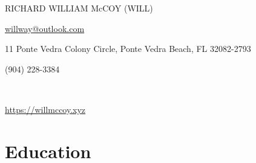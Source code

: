 \documentclass{article}
\newcommand\midtextbox[1]{%
  \parbox{.6\textwidth}{#1}%
}
\newcommand\outtextbox[1]{%
  \parbox{.2\textwidth}{#1}%
}
\newenvironment{TitleCenter}[1][\topsep]
  {\setlength{\topsep}{#1}\par\kern\topsep\centering}%
  {\par\kern\topsep}%
\begin{document}
\thispagestyle{empty}

\begin{TitleCenter}[0em]
\bfseries\huge

RICHARD WILLIAM McCOY (WILL)
\end{TitleCenter}
\noindent\outtextbox{\href{willway@outlook.com}{willway@outlook.com}\hfill}\midtextbox{\hfil11 Ponte Vedra Colony Circle, Ponte Vedra Beach, FL 32082-2793\hfil}\outtextbox{\hfill (904) 228-3384} \\
\noindent\outtextbox{\href{https://willmccoy.xyz}{https://willmccoy.xyz}\hfill}\midtextbox{\hfil\hfil}\outtextbox{\hfill}


\vspace{-1em}
\section{Education}
\end{document}
